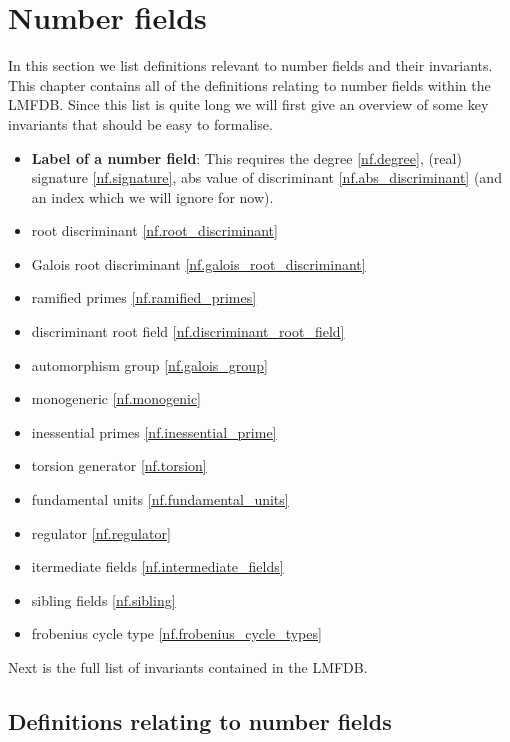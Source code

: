 
\chapter{Number fields}

In this section we list definitions relevant to number fields and their invariants. This chapter
contains all of the definitions relating to number fields within the LMFDB. Since this list is quite long
we will first give an overview of some key invariants that should be easy to formalise.


\begin{itemize}
    \item \textbf{Label of a number field}: This requires the degree \ref{nf.degree}, (real) signature \ref{nf.signature},
     abs value of discriminant \ref{nf.abs_discriminant} (and an index which we will ignore for now).
    \item root discriminant \ref{nf.root_discriminant}
    \item Galois root discriminant \ref{nf.galois_root_discriminant}
    \item ramified primes \ref{nf.ramified_primes}
    \item discriminant root field \ref{nf.discriminant_root_field}
    \item automorphism group \ref{nf.galois_group}
    \item monogeneric \ref{nf.monogenic}
    \item inessential primes \ref{nf.inessential_prime}
    \item torsion generator \ref{nf.torsion}
    \item fundamental units \ref{nf.fundamental_units}
    \item regulator \ref{nf.regulator}
    \item itermediate fields \ref{nf.intermediate_fields}
    \item sibling fields \ref{nf.sibling}
    \item frobenius cycle type \ref{nf.frobenius_cycle_types}
    \end{itemize}

Next is the full list of invariants contained in the LMFDB.


\section{Definitions relating to number fields}

